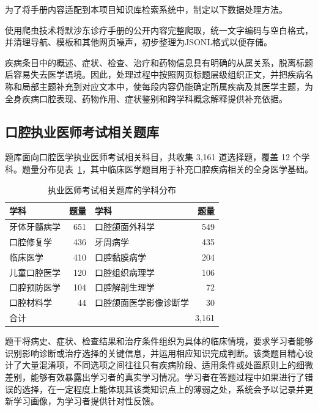 为了将手册内容适配到本项目知识库检索系统中，制定以下数据处理方法。


使用爬虫技术将默沙东诊疗手册的公开内容完整爬取，统一文字编码与空白格式，并清理导航、模板和其他网页噪声，初步整理为JSONL格式以便存储。


疾病条目中的概述、症状、检查、治疗和药物信息具有明确的从属关系，脱离标题后容易失去医学语境。因此，处理过程中按照网页标题层级组织正文，并把疾病名称和局部主题补充到对应文本中，使每段内容仍能确定所属疾病及其医学主题，为全身疾病口腔表现、药物作用、症状鉴别和跨学科概念解释提供补充依据。


\subsection{口腔执业医师考试相关题库}

题库面向口腔医学执业医师考试相关科目，共收集 3,161 道选择题，覆盖 12 个学科。题量分布见表~\ref{tab:question-inputs}，其中临床医学题目用于补充口腔疾病相关的全身医学基础。

\begin{table}[H]
  \centering
  \caption{执业医师考试相关题库的学科分布}
  \label{tab:question-inputs}
  \begin{tabularx}{\linewidth}{X r X r}
    \toprule
    学科 & 题量 & 学科 & 题量 \\
    \midrule
    牙体牙髓病学 & 651 & 口腔颌面外科学 & 549 \\
    口腔修复学 & 436 & 牙周病学 & 435 \\
    临床医学 & 410 & 口腔黏膜病学 & 204 \\
    儿童口腔医学 & 120 & 口腔组织病理学 & 106 \\
    口腔预防医学 & 104 & 口腔解剖生理学 & 72 \\
    口腔材料学 & 44 & 口腔颌面医学影像诊断学 & 30 \\
    \midrule
    合计 & \multicolumn{3}{r}{3,161} \\
    \bottomrule
  \end{tabularx}
\end{table}

题干将病史、症状、检查结果和治疗条件组织为具体的临床情境，要求学习者能够识别影响诊断或治疗选择的关键信息，并运用相应知识完成判断。该类题目精心设计了大量混淆项，不同选项之间往往只有疾病阶段、适用条件或处置原则上的细微差别，能够有效暴露出学习者的真实学习情况。学习者在答题过程中如果进行了错误的选择，在一定程度上能体现其该类知识点上的薄弱之处，系统会予以记录并更新学习画像，为学习者提供针对性反馈。

